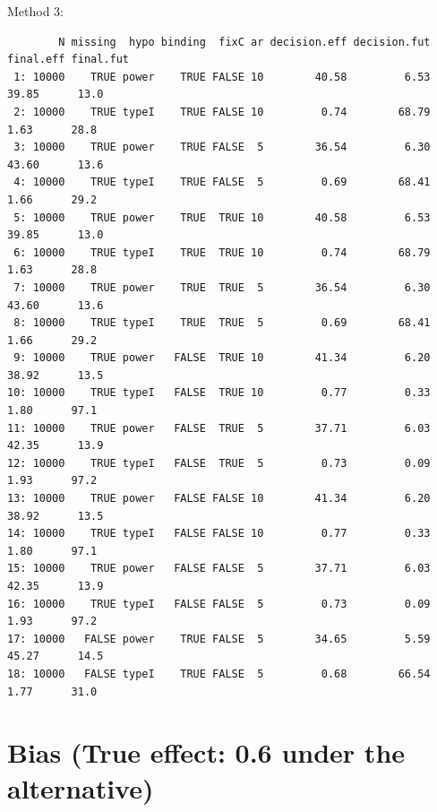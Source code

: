 \documentclass[12pt]{article}
\begin{document}
Method 3:
\begin{verbatim}
        N missing  hypo binding  fixC ar decision.eff decision.fut final.eff final.fut
 1: 10000    TRUE power    TRUE FALSE 10        40.58         6.53     39.85      13.0
 2: 10000    TRUE typeI    TRUE FALSE 10         0.74        68.79      1.63      28.8
 3: 10000    TRUE power    TRUE FALSE  5        36.54         6.30     43.60      13.6
 4: 10000    TRUE typeI    TRUE FALSE  5         0.69        68.41      1.66      29.2
 5: 10000    TRUE power    TRUE  TRUE 10        40.58         6.53     39.85      13.0
 6: 10000    TRUE typeI    TRUE  TRUE 10         0.74        68.79      1.63      28.8
 7: 10000    TRUE power    TRUE  TRUE  5        36.54         6.30     43.60      13.6
 8: 10000    TRUE typeI    TRUE  TRUE  5         0.69        68.41      1.66      29.2
 9: 10000    TRUE power   FALSE  TRUE 10        41.34         6.20     38.92      13.5
10: 10000    TRUE typeI   FALSE  TRUE 10         0.77         0.33      1.80      97.1
11: 10000    TRUE power   FALSE  TRUE  5        37.71         6.03     42.35      13.9
12: 10000    TRUE typeI   FALSE  TRUE  5         0.73         0.09      1.93      97.2
13: 10000    TRUE power   FALSE FALSE 10        41.34         6.20     38.92      13.5
14: 10000    TRUE typeI   FALSE FALSE 10         0.77         0.33      1.80      97.1
15: 10000    TRUE power   FALSE FALSE  5        37.71         6.03     42.35      13.9
16: 10000    TRUE typeI   FALSE FALSE  5         0.73         0.09      1.93      97.2
17: 10000   FALSE power    TRUE FALSE  5        34.65         5.59     45.27      14.5
18: 10000   FALSE typeI    TRUE FALSE  5         0.68        66.54      1.77      31.0
\end{verbatim}

\clearpage

\section{Bias (True effect: 0.6 under the alternative)}
\label{sec:org01885da}
\end{document}

